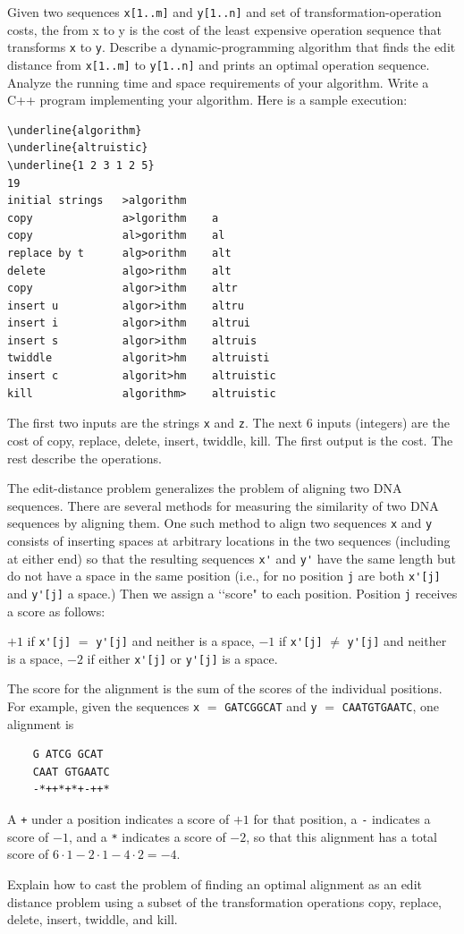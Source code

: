 \begin{tightlist}
\item[(a)]
Given two sequences \verb!x[1..m]! and \verb!y[1..n]!
and set of transformation-operation
costs, the  from x to y is the cost of the least expensive operation
sequence that transforms \verb!x! to \verb!y!. Describe a dynamic-programming algorithm
that finds the edit distance from \verb!x[1..m]! to \verb!y[1..n]! and prints an optimal operation
sequence. Analyze the running time and space requirements of your
algorithm.
Write a C++ program implementing your algorithm.
Here is a sample execution:
\begin{Verbatim}[frame=single,commandchars=\\\{\}]
\underline{algorithm}
\underline{altruistic}
\underline{1 2 3 1 2 5}
19
initial strings   >algorithm    
copy              a>lgorithm    a
copy              al>gorithm    al
replace by t      alg>orithm    alt
delete            algo>rithm    alt
copy              algor>ithm    altr
insert u          algor>ithm    altru
insert i          algor>ithm    altrui
insert s          algor>ithm    altruis
twiddle           algorit>hm    altruisti
insert c          algorit>hm    altruistic
kill              algorithm>    altruistic
\end{Verbatim}
The first two inputs are the strings \verb!x! and \verb!z!.
The next 6 inputs (integers) are the cost of copy, replace, delete, insert, twiddle, kill.
The first output is the cost.
The rest describe the operations.
\end{tightlist}

The edit-distance problem generalizes the problem of aligning two DNA sequences.
There are several
methods for measuring the similarity of two DNA sequences by aligning them.
One such method to align two sequences \verb!x! and \verb!y! consists of inserting spaces at
arbitrary locations in the two sequences (including at either end) so that the resulting
sequences \verb!x'! and \verb!y'! have the same length but do not have a space in the same
position (i.e., for no position \verb!j! are both \verb!x'[j]! and \verb!y'[j]! a space.) Then we assign a
\lq\lq score" to each position. Position \verb!j! receives a score as follows:
\begin{tightlist}
\li $+1$ if \verb!x'[j]! $=$ \verb!y'[j]! and neither is a space,
\li $-1$ if \verb!x'[j]! $\neq$ \verb!y'[j]! and neither is a space,
\li $-2$ if either \verb!x'[j]! or \verb!y'[j]! is a space.
\end{tightlist}
The score for the alignment is the sum of the scores of the individual positions. For
example, given the sequences \verb!x! $=$ \verb!GATCGGCAT! and \verb!y! $=$ \verb!CAATGTGAATC!, one
alignment is
\newpage
\begin{Verbatim}
    G ATCG GCAT
    CAAT GTGAATC
    -*++*+*+-++*
\end{Verbatim}
A \verb!+! under a position indicates a score of $+1$ for that position, a \verb!-! indicates a score
of $-1$, and a \verb!*! indicates a score of $-2$, so that this alignment has a total score of
$6 \cdot 1 - 2 \cdot 1 - 4 \cdot 2 = -4$.

\begin{tightlist}
\item[(b)]
Explain how to cast the problem of finding an optimal alignment as an edit
distance problem using a subset of the transformation operations copy, replace,
delete, insert, twiddle, and kill.
\end{tightlist}

